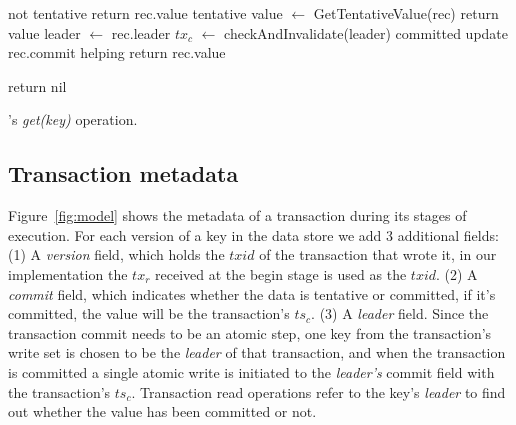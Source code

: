 \begin{algorithm}[t]
  \begin{algorithmic}
    \begin{small}
       \Comment not tentative
        \State return rec.value \EndIf
      \Else \Comment tentative
      \State value $\leftarrow$ {\sc GetTentativeValue(rec)}
	  \State return value
      \EndIf
      \EndIf
      \EndFor
      \EndProcedure
      \Statex
      \State leader $\leftarrow$ rec.leader
      \State $tx_c$ $\leftarrow$ checkAndInvalidate(leader)
       \Comment  committed
      \State update rec.commit \Comment helping 
        return rec.value \EndIf
      \Else

      \State  return nil
      \EndIf
      \EndProcedure
    \end{small}
  \end{algorithmic}
  \caption{\sys's \emph{get(key)} operation.} 
  \label{fig:get-pseudocode}
\end{algorithm} 




\subsection{Transaction metadata}
\label{ssec:tso}
Figure~\ref{fig:model} shows the metadata of a transaction during its stages of execution. For each version of a key in the data store we add 3 additional fields: (1) A \emph{version} field, which holds the $txid$ of the transaction that wrote it, in our implementation the $tx_r$ received at the begin stage is used as the $txid$. (2) A \emph{commit} field, which indicates whether the data is tentative or committed, if it's committed, the value will be the transaction's $ts_c$. (3) A \emph{leader} field. Since the transaction commit needs to be an atomic step, one key from the transaction's write set is chosen to be the \emph{leader} of that transaction, and when the transaction is committed a single atomic write is initiated to the \emph{leader's} commit field with the transaction's $ts_c$. Transaction read operations refer to the key's \emph{leader} to find out whether the value has been committed or not.




